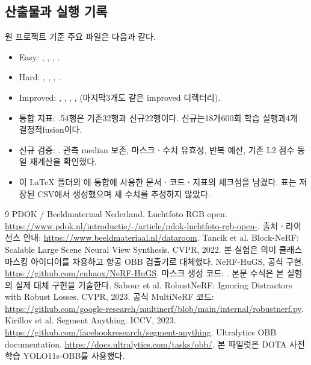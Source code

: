 \documentclass[11pt,a4paper]{article}
\begin{document}
\subsection{산출물과 실행 기록}
원 프로젝트 기준 주요 파일은 다음과 같다.
\begin{itemize}
\item Easy: , , , .
\item Hard: , , , .
\item Improved: , , , ,  (마지막3개도 같은 improved 디렉터리).
\item 통합 지표: .54행은 기존32행과 신규22행이다. 신규는18개600회 학습 실행과4개 결정적fusion이다.
\item 신규 검증: . 관측 median 보존, 마스크ㆍ수치 유효성, 반복 예산, 기존 L2 점수 동일 재계산을 확인했다.
\item 이 LaTeX 폴더의 에 통합에 사용한 문서ㆍ코드ㆍ지표의 체크섬을 남겼다. 표는 저장된 CSV에서 생성했으며 새 수치를 추정하지 않았다.
\end{itemize}

\begin{thebibliography}{9}
 PDOK / Beeldmateriaal Nederland. Luchtfoto RGB open. \url{https://www.pdok.nl/introductie/-/article/pdok-luchtfoto-rgb-open-}. 출처ㆍ라이선스 안내: \url{https://www.beeldmateriaal.nl/dataroom}.
 Tancik et al. Block-NeRF: Scalable Large Scene Neural View Synthesis. CVPR, 2022. 본 실험은 의미 클래스 마스킹 아이디어를 차용하고 항공 OBB 검출기로 대체했다.
 NeRF-HuGS, 공식 구현. \url{https://github.com/cnhaox/NeRF-HuGS}. 마스크 생성 코드: . 본문 수식은 본 실험의 실제 대체 구현을 기술한다.
 Sabour et al. RobustNeRF: Ignoring Distractors with Robust Losses. CVPR, 2023. 공식 MultiNeRF 코드: \url{https://github.com/google-research/multinerf/blob/main/internal/robustnerf.py}.
 Kirillov et al. Segment Anything. ICCV, 2023. \url{https://github.com/facebookresearch/segment-anything}.
 Ultralytics OBB documentation. \url{https://docs.ultralytics.com/tasks/obb/}. 본 파일럿은 DOTA 사전학습 YOLO11s-OBB를 사용했다.
\end{thebibliography}
\end{document}

